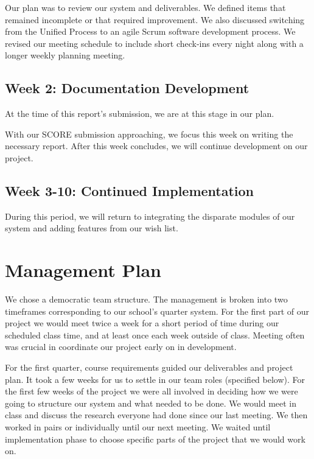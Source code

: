 \documentclass[12pt]{article}
\begin{document}
Our plan was to review our system and deliverables. We defined items that remained incomplete or that required improvement. We also discussed switching from the Unified Process to an agile Scrum software development process. We revised our meeting schedule to include short check-ins every night along with a longer weekly planning meeting. 

\subsection*{Week 2: Documentation Development}

At the time of this report's submission, we are at this stage in our plan.

With our SCORE submission approaching, we focus this week on writing the necessary report. After this week concludes, we will continue development on our project.

\subsection*{Week 3-10: Continued Implementation}

During this period, we will return to integrating the disparate modules of our system and adding features from our wish list.

\section{Management Plan} %

We chose a democratic team structure. The management is broken into two timeframes corresponding to our school's quarter system. For the first part of our project we would meet twice a week for a short period of time during our scheduled class time, and at least once each week outside of class. Meeting often was crucial in coordinate our project early on in development.

For the first quarter, course requirements guided our deliverables and project plan. It took a few weeks for us to settle in our team roles (specified below). For the first few weeks of the project we were all involved in deciding how we were going to structure our system and what needed to be done. We would meet in class and discuss the research everyone had done since our last meeting. We then worked in pairs or individually until our next meeting. We waited until implementation phase to choose specific parts of the project that we would work on. 
 
\end{document}

